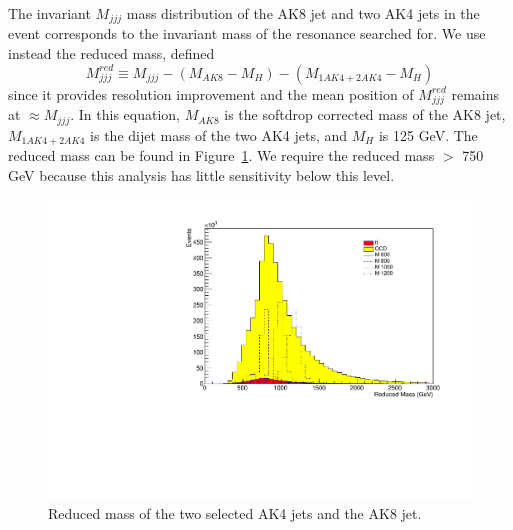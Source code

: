 The invariant $M_{jjj}$ mass distribution of the AK8 jet and two AK4 jets in the event corresponds to the invariant mass of the resonance searched for. We use instead the reduced mass, defined
\begin{equation}
M_{jjj}^{red} \equiv M_{jjj} - (M_{AK8}-M_{H}) - (M_{1AK4 + 2AK4}-M_{H})
\label{eq:Mjjs}
\end{equation}
since it provides resolution improvement and the mean position of $M_{jjj}^{red}$ remains at $\approx M_{jjj}$. In this equation, $M_{AK8}$ is the softdrop corrected mass of the AK8 jet, $M_{1AK4 + 2AK4}$ is the dijet mass of the two AK4 jets, and $M_{H}$ is 125 GeV. The reduced mass can be found in Figure~\ref{fig:redm}.
We require the reduced mass $>$ 750 GeV because this analysis has little sensitivity below this level.

\begin{figure}[h]
\begin{center}
\includegraphics[scale=0.5]{F5/shaperedmass.pdf}
\end{center}
\caption{Reduced mass of the two selected AK4 jets and the AK8 jet.}
\label{fig:redm}
\end{figure} 

